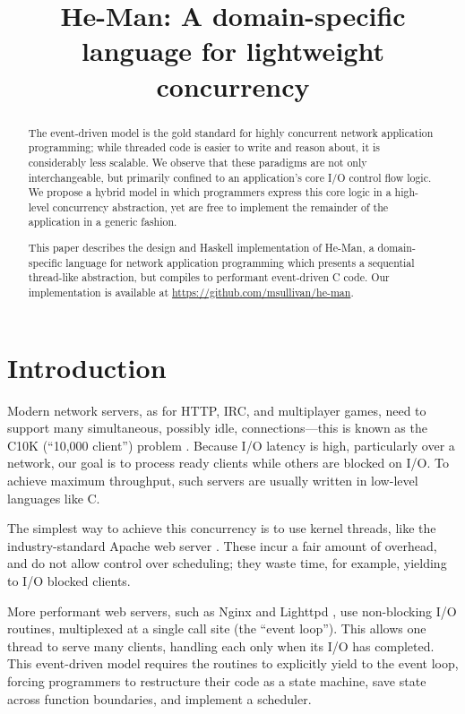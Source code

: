 \documentclass[preprint]{sigplanconf}
\title{He-Man: A domain-specific language for lightweight concurrency}
\begin{document}
\maketitle

\begin{abstract}
The event-driven model is the gold standard for highly concurrent network
application programming; while threaded code is easier to write and reason
about, it is considerably less scalable. We observe that these paradigms are not
only interchangeable, but primarily confined to an application's core I/O
control flow logic. We propose a hybrid model in which programmers express this
core logic in a high-level concurrency abstraction, yet are free to implement
the remainder of the application in a generic fashion.

This paper describes the design and Haskell implementation of He-Man, a
domain-specific language for network application programming which presents a
sequential thread-like abstraction, but compiles to performant event-driven C
code. Our implementation is available at
\url{https://github.com/msullivan/he-man}. %
\end{abstract}

\section{Introduction}

Modern network servers, as for HTTP, IRC, and multiplayer games, need to support
many simultaneous, possibly idle, connections---this is known as the C10K
(``10,000 client'') problem \cite{Kegel}. Because I/O latency is high,
particularly over a network, our goal is to process ready clients while others
are blocked on I/O. To achieve maximum throughput, such servers are usually
written in low-level languages like C.

The simplest way to achieve this concurrency is to use kernel threads, like the
industry-standard Apache web server \cite{Apache}. These incur a fair amount of
overhead, and do not allow control over scheduling; they waste time, for
example, yielding to I/O blocked clients.

More performant web servers, such as Nginx \cite{Nginx} and Lighttpd
\cite{Lighttpd}, use non-blocking I/O routines, multiplexed at a single call
site (the ``event loop''). This allows one thread to serve many clients,
handling each only when its I/O has completed. This event-driven model requires
the routines to explicitly yield to the event loop, forcing programmers to
restructure their code as a state machine, save state across function
boundaries, and implement a scheduler. 
\end{document}
